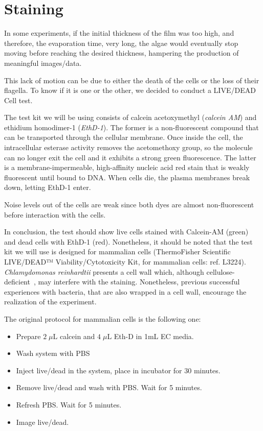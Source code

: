\section{Staining}

In some experiments, if the initial thickness of the film was too high, and therefore, the evaporation time, very long, the algae would eventually stop moving before reaching the desired thickness, hampering the production of meaningful images/data.

This lack of motion can be due to either the death of the cells or the loss of their flagella. To know if it is one or the other, we decided to conduct a LIVE/DEAD Cell test. 

The test kit we will be using consists of calcein acetoxymethyl (\textit{calcein AM}) and ethidium homodimer-1 (\textit{EthD-1}). The former is a non-fluorescent compound that can be transported through the cellular membrane. Once inside the cell, the intracellular esterase activity removes the acetomethoxy group, so the molecule can no longer exit the cell and it exhibits a strong green fluorescence. The latter is a membrane-impermeable, high-affinity nucleic acid red stain that is weakly fluorescent until bound to DNA. When cells die, the plasma membranes break down, letting EthD-1 enter.

Noise levels out of the cells are weak since both dyes are almost non-fluorescent before interaction with the cells.

In conclusion, the test should show live cells stained with Calcein-AM (green) and dead cells with EthD-1 (red). Nonetheless, it should be noted that the test kit we will use is designed for mammalian cells (ThermoFisher Scientific LIVE/DEAD™ Viability/Cytotoxicity Kit, for mammalian cells: ref. L3224). \textit{Chlamydomonas reinhardtii} presents a cell wall which, although cellulose-deficient~\cite{Imam}, may interfere with the staining. Nonetheless, previous successful experiences with bacteria, that are also wrapped in a cell wall, encourage the realization of the experiment. 

The original protocol for mammalian cells is the following one:

\begin{itemize}
	\item Prepare $2 \; \mu \textrm{L}$ calcein and $4 \; \mu \textrm{L}$ Eth-D in 1mL EC media.
	\item Wash system with PBS
	\item Inject live/dead in the system, place in incubator for 30 minutes.
	\item Remove live/dead and wash with PBS. Wait for 5 minutes.
	\item Refresh PBS. Wait for 5 minutes.
	\item Image live/dead.
\end{itemize}

